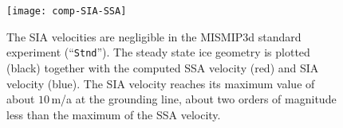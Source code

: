 \begin{figure}[ht]
\centering
\texttt{[image: comp-SIA-SSA]}
\caption{The SIA velocities are negligible in the MISMIP3d standard experiment (``\texttt{Stnd}'').  The steady state ice geometry is plotted (black) together with the computed SSA velocity (red) and SIA velocity (blue). The SIA velocity reaches its maximum value of about $10\,$m/a at the grounding line, about two orders of magnitude less than the maximum of the SSA velocity.}
\label{fig:compSIASSA}
\end{figure}

